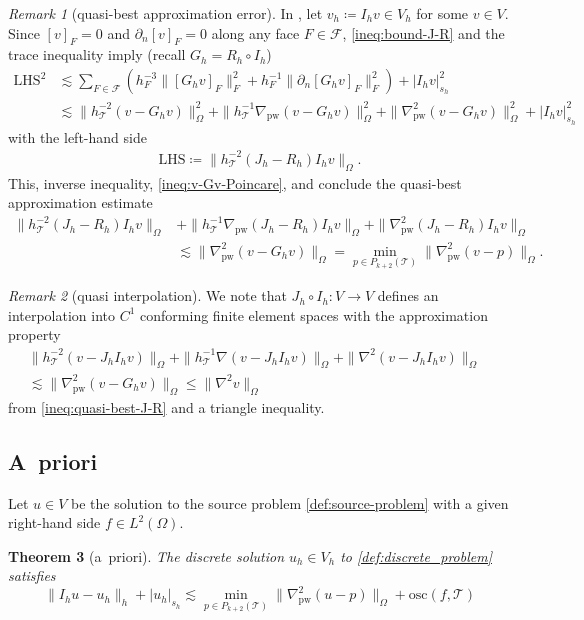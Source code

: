 \documentclass[a4paper]{amsart}
\numberwithin{equation}{section}
\def\F{\mathcal{F}}
\def\T{\mathcal{T}}
\def\pw{\mathrm{pw}}
\newtheorem{theorem}{Theorem}[section]
\theoremstyle{definition}
\theoremstyle{remark}
\newtheorem{remark}[theorem]{Remark}
\numberwithin{theorem}{section}
\numberwithin{equation}{section}
\numberwithin{table}{section}
\numberwithin{figure}{section}
\begin{document}
\begin{remark}[quasi-best approximation error]
	In , let $v_h \coloneqq I_h v \in V_h$ for some $v \in V$. Since $[v]_F = 0$ and $\partial_n [v]_F = 0$ along any face $F \in \F$, \eqref{ineq:bound-J-R} and the trace inequality imply (recall $G_h = R_h \circ I_h$)
	\begin{align*}
		\mathrm{LHS}^2
		&\lesssim \sum_{F \in \F} (h_F^{-3} \|[G_h v]_F\|^2_F + h_F^{-1} \|\partial_n [G_h v]_F\|^2_F) + |I_h v|_{s_h}^2\\
		&\lesssim \|h_\T^{-2}(v - G_h v)\|_\Omega^2 + \|h_\T^{-1}\nabla_\pw(v - G_h v)\|_\Omega^2 + \|\nabla^2_\pw(v - G_h v)\|_\Omega^2 + |I_h v|_{s_h}^2
	\end{align*}
	with the left-hand side
	\begin{align*}
		\mathrm{LHS} \coloneqq \|h_\T^{-2}(J_h - R_h) I_h v\|_\Omega .
	\end{align*}
	This, inverse inequality, \eqref{ineq:v-Gv-Poincare}, and  conclude the quasi-best approximation estimate
	\begin{equation}\label{ineq:quasi-best-J-R}
    \begin{aligned}
        \|h_\T^{-2}(J_h - R_h) I_h v\|_\Omega &+ \|h_\T^{-1}\nabla_\pw(J_h - R_h) I_h v\|_\Omega + \|\nabla_\pw^2(J_h - R_h) I_h v\|_\Omega \\ & \lesssim \|\nabla_\pw^2(v - G_h v)\|_\Omega = \min_{p \in P_{k+2}(\T)} \|\nabla_\pw^2(v - p)\|_\Omega.
    \end{aligned}
	\end{equation}
\end{remark}
\begin{remark}[quasi interpolation]
	We note that $J_h \circ I_h : V \to V$ defines an interpolation into $C^1$ conforming finite element spaces with the approximation property
	\begin{align}\label{ineq:quasi-interpolation}
		\|h_\T^{-2}(v - J_h I_h v)\|_\Omega + \|h_\T^{-1}\nabla (v - J_h I_h v)\|_\Omega + \|\nabla^2(v - J_h I_h v)\|_\Omega&\nonumber\\
		\lesssim \|\nabla_\pw^2(v - G_h v)\|_\Omega \leq \|\nabla^2 v\|_\Omega&
	\end{align}
	from \eqref{ineq:quasi-best-J-R} and a triangle inequality. 
\end{remark}

\subsection{A~priori}
Let $u \in V$ be the solution to the source problem \eqref{def:source-problem} with a given right-hand side $f \in L^2(\Omega)$.
\begin{theorem}[a~priori]\label{thm:a-priori}
    The discrete solution $u_h \in V_h$ to \eqref{def:discrete_problem} satisfies
    \begin{equation}\label{ineq:a-priori-thm}
        \|I_h u - u_h\|_{h} + |u_h|_{s_h} \lesssim \min_{p \in P_{k+2}(\mathcal{T})}\|\nabla^2_\pw(u - p)\|_{\Omega} + \mathrm{osc}(f,\mathcal{T})
    \end{equation}
\end{theorem}
\end{document}
